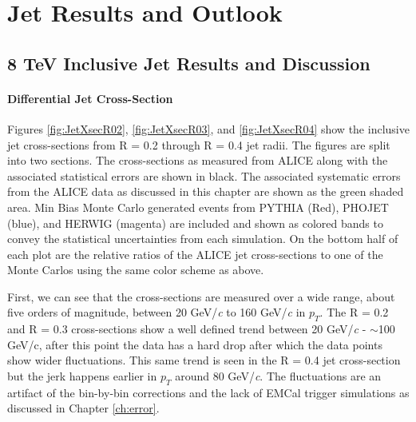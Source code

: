 \chapter{Jet Results and Outlook} \label{ch:cando}

\section{8 TeV Inclusive Jet Results and Discussion}

\subsubsection{Differential Jet Cross-Section}


\noindent
Figures \ref{fig:JetXsecR02}, \ref{fig:JetXsecR03}, and \ref{fig:JetXsecR04} show the inclusive jet cross-sections from R = 0.2 through R = 0.4 jet radii.  The figures are split into two sections.  The cross-sections as measured from ALICE along with the associated statistical errors are shown in black.  The associated systematic errors from the ALICE data as discussed in this chapter are shown as the green shaded area.  Min Bias Monte Carlo generated events from PYTHIA (Red), PHOJET (blue), and HERWIG (magenta) are included and shown as colored bands to convey the statistical uncertainties from each simulation.  On the bottom half of each plot are the relative ratios of the ALICE jet cross-sections to one of the Monte Carlos using the same color scheme as above.  

First, we can see that the cross-sections are measured over a wide range, about five orders of magnitude, between 20 GeV/\textit{c} to 160 GeV/\textit{c} in $p_{T}$.  The R = 0.2 and R = 0.3 cross-sections show a well defined trend between 20 GeV/\textit{c} - $\sim$100 GeV/c, after this point the data  has a hard drop after which the data points show wider fluctuations.  This same trend is seen in the R = 0.4 jet cross-section but the jerk happens earlier in $p_{T}$ around  80 GeV/\textit{c}.  The fluctuations are an artifact of the bin-by-bin corrections and the lack of EMCal trigger simulations as discussed in Chapter \ref{ch:error}.  

